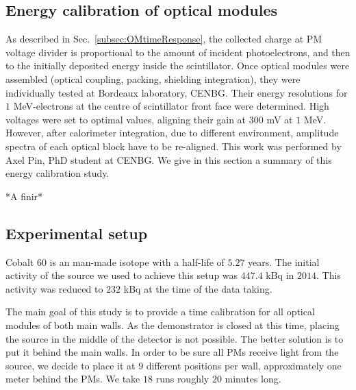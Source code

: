 

\subsection{Energy calibration of optical modules}
\label{subsec:OMenergyCalib}

As described in Sec.~\ref{subsec:OMtimeResponse}, the collected charge at PM voltage divider is proportional to the amount of incident photoelectrons, and then to the initially deposited energy inside the scintillator.
Once optical modules were assembled (optical coupling, packing, shielding integration), they were individually tested at Bordeaux laboratory, CENBG.
Their energy resolutions for $1$ MeV-electrons at the centre of scintillator front face were determined.
High voltages were set to optimal values, aligning their gain at $300$ mV at $1$ MeV.
However, after calorimeter integration, due to different environment, amplitude spectra of each optical block have to be re-aligned.
This work was performed by Axel Pin, PhD student at CENBG.
We give in this section a summary of this energy calibration study.

*A finir*

\subsection{Experimental setup}

Cobalt $60$ is an man-made isotope with a half-life of $5.27$ years.
The initial activity of the source we used to achieve this setup was $447.4$ kBq in $2014$.
This activity was reduced to $232$ kBq at the time of the data taking.

The main goal of this study is to provide a time calibration for all optical modules of both main walls.
As the demonstrator is closed at this time, placing the source in the middle of the detector is not possible.
The better solution is to put it behind the main walls.
In order to be sure all PMs receive light from the source, we decide to place it at $9$ different positions per wall, approximately one meter behind the PMs.
We take $18$ runs roughly $20$ minutes long.


